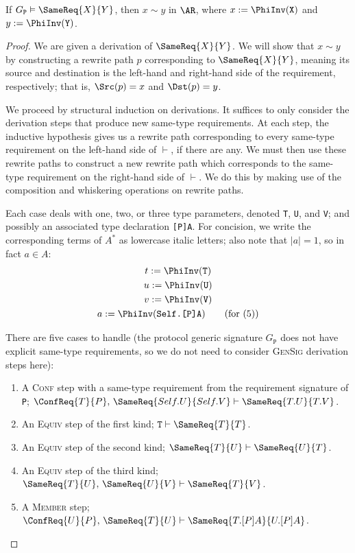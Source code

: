 \documentclass[../generics]{subfiles}
\begin{document}
\begin{theorem}\label{derivation to path}
If $G_\texttt{P}\vDash\SameReq{X}{Y}$, then $x\sim y$ in $\AR$, where $x:=\PhiInv(\texttt{X})$ and $y:=\PhiInv(\texttt{Y})$.
\end{theorem}
\begin{proof}
We are given a derivation of $\SameReq{X}{Y}$. We will show that $x\sim y$ by constructing a rewrite path $p$ corresponding to $\SameReq{X}{Y}$, meaning its source and destination is the left-hand and right-hand side of the requirement, respectively; that is, $\Src(p)=x$ and $\Dst(p)=y$.

We proceed by structural induction on derivations. It suffices to only consider the derivation steps that produce new same-type requirements. At each step, the inductive hypothesis gives us a rewrite path corresponding to every same-type requirement on the left-hand side of $\vdash$, if there are any. We must then use these rewrite paths to construct a new rewrite path which corresponds to the same-type requirement on the right-hand side of $\vdash$. We do this by making use of the composition and whiskering operations on rewrite paths.

Each case deals with one, two, or three type parameters, denoted \texttt{T}, \texttt{U}, and \texttt{V}; and possibly an associated type declaration \texttt{[P]A}. For concision, we write the corresponding terms of $A^*$ as lowercase italic letters; also note that $|a|=1$, so in fact $a\in A$:
\begin{gather*}
t:=\PhiInv(\texttt{T})\\
u:=\PhiInv(\texttt{U})\\
v:=\PhiInv(\texttt{V})\\
a:=\PhiInv(\texttt{Self.[P]A})\qquad\mbox{(for (5))}
\end{gather*}

There are five cases to handle (the protocol generic signature $G_\texttt{P}$ does not have explicit same-type requirements, so we do not need to consider \textsc{GenSig} derivation steps here):
\begin{enumerate}
\item A \textsc{Conf} step with a same-type requirement from the requirement signature of \texttt{P}; $\ConfReq{T}{P},\,\SameReq{Self.U}{Self.V}\vdash\SameReq{T.U}{T.V}$.
\item An \textsc{Equiv} step of the first kind; $\texttt{T}\vdash\SameReq{T}{T}$.
\item An \textsc{Equiv} step of the second kind; $\SameReq{T}{U}\vdash\SameReq{U}{T}$.
\item An \textsc{Equiv} step of the third kind; $\SameReq{T}{U},\,\SameReq{U}{V}\vdash\SameReq{T}{V}$.
\item A \textsc{Member} step; $\ConfReq{U}{P},\,\SameReq{T}{U}\vdash\SameReq{T.[P]A}{U.[P]A}$.
\end{enumerate}


\end{proof}
\end{document}
